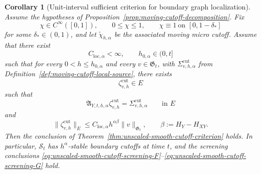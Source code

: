 \documentclass[11pt,a4paper]{amsart}
\theoremstyle{plain}
\newtheorem{corollary}[theorem]{Corollary}
\theoremstyle{definition}
\theoremstyle{remark}
\begin{document}
\begin{corollary}[Unit-interval sufficient criterion for boundary graph localization]
\label{cor:unit-interval-unscaled-criterion}
Assume the hypotheses of Proposition~\ref{prop:moving-cutoff-decomposition}. Fix
\[
\chi\in C^\infty([0,1]),
\qquad
0\le \chi\le1,
\qquad
\chi\equiv1\ \text{on }[0,1-\delta_*]
\]
for some \(\delta_*\in(0,1)\), and let \(\widetilde\chi_{h,\alpha}\) be the associated moving micro
cutoff. Assume that there exist
\[
C_{\mathrm{loc},\alpha}<\infty,
\qquad
h_{0,\alpha}\in(0,t]
\]
such that for every \(0<h\le h_{0,\alpha}\) and every \(v\in\mathfrak G_t\), with
\(\Sigma_{v,h,\alpha}^{\mathrm{cut}}\) from Definition~\ref{def:moving-cutoff-local-source},
there exists
\[
\zeta_{v,h}^{\mathrm{cut}}\in E
\]
such that
\begin{equation}\label{eq:unit-interval-unscaled-eq}
\mathfrak A_{Y,t,h,\alpha}\zeta_{v,h}^{\mathrm{cut}}
=
\Sigma_{v,h,\alpha}^{\mathrm{cut}}
\qquad\text{in }E
\end{equation}
and
\begin{equation}\label{eq:unit-interval-unscaled-bound}
\|\zeta_{v,h}^{\mathrm{cut}}\|_E
\le
C_{\mathrm{loc},\alpha}h^{\alpha\beta}\|v\|_{\mathfrak G_t},
\qquad
\beta:=H_Y-H_{XY}.
\end{equation}
Then the conclusion of Theorem~\ref{thm:unscaled-smooth-cutoff-criterion} holds. In particular,
\(\mathcal S_t\) has \(h^\alpha\)-stable boundary cutoffs at time \(t\), and the screening
conclusions
\eqref{eq:unscaled-smooth-cutoff-screening-F}--\eqref{eq:unscaled-smooth-cutoff-screening-G} hold.
\end{corollary}
\end{document}
